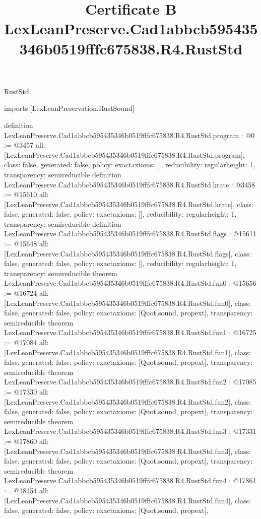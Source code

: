 \begin{lexlean}{RustStd}
\title{Certificate B LexLeanPreserve.Cad1abbcb595435346b0519fffc675838.R4.RustStd}
\begin{coremodule}
imports [LexLeanPreservation.RustSound]

definition LexLeanPreserve.Cad1abbcb595435346b0519fffc675838.R4.RustStd.program : @0 := @3457 {
  all: [LexLeanPreserve.Cad1abbcb595435346b0519fffc675838.R4.RustStd.program],
  class: false,
  generated: false,
  policy: exact{axioms: []},
  reducibility: regular{height: 1},
  transparency: semireducible
}
definition LexLeanPreserve.Cad1abbcb595435346b0519fffc675838.R4.RustStd.krate : @3458 := @15610 {
  all: [LexLeanPreserve.Cad1abbcb595435346b0519fffc675838.R4.RustStd.krate],
  class: false,
  generated: false,
  policy: exact{axioms: []},
  reducibility: regular{height: 1},
  transparency: semireducible
}
definition LexLeanPreserve.Cad1abbcb595435346b0519fffc675838.R4.RustStd.flags : @15611 := @15648 {
  all: [LexLeanPreserve.Cad1abbcb595435346b0519fffc675838.R4.RustStd.flags],
  class: false,
  generated: false,
  policy: exact{axioms: []},
  reducibility: regular{height: 1},
  transparency: semireducible
}
theorem LexLeanPreserve.Cad1abbcb595435346b0519fffc675838.R4.RustStd.fun0 : @15656 := @16724 {
  all: [LexLeanPreserve.Cad1abbcb595435346b0519fffc675838.R4.RustStd.fun0],
  class: false,
  generated: false,
  policy: exact{axioms: [Quot.sound, propext]},
  transparency: semireducible
}
theorem LexLeanPreserve.Cad1abbcb595435346b0519fffc675838.R4.RustStd.fun1 : @16725 := @17084 {
  all: [LexLeanPreserve.Cad1abbcb595435346b0519fffc675838.R4.RustStd.fun1],
  class: false,
  generated: false,
  policy: exact{axioms: [Quot.sound, propext]},
  transparency: semireducible
}
theorem LexLeanPreserve.Cad1abbcb595435346b0519fffc675838.R4.RustStd.fun2 : @17085 := @17330 {
  all: [LexLeanPreserve.Cad1abbcb595435346b0519fffc675838.R4.RustStd.fun2],
  class: false,
  generated: false,
  policy: exact{axioms: [Quot.sound, propext]},
  transparency: semireducible
}
theorem LexLeanPreserve.Cad1abbcb595435346b0519fffc675838.R4.RustStd.fun3 : @17331 := @17860 {
  all: [LexLeanPreserve.Cad1abbcb595435346b0519fffc675838.R4.RustStd.fun3],
  class: false,
  generated: false,
  policy: exact{axioms: [Quot.sound, propext]},
  transparency: semireducible
}
theorem LexLeanPreserve.Cad1abbcb595435346b0519fffc675838.R4.RustStd.fun4 : @17861 := @18154 {
  all: [LexLeanPreserve.Cad1abbcb595435346b0519fffc675838.R4.RustStd.fun4],
  class: false,
  generated: false,
  policy: exact{axioms: [Quot.sound, propext]},
}
\end{coremodule}
\end{lexlean}
